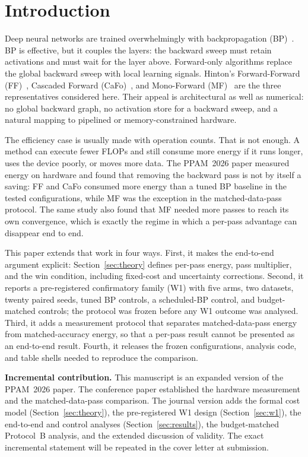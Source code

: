 \documentclass[preprint,12pt]{elsarticle}
\newcommand{\ppam}{the PPAM~2026 paper}
\begin{document}
\section{Introduction}
\label{sec:intro}

Deep neural networks are trained overwhelmingly with backpropagation
(BP)~\cite{rumelhart1986learning}.  BP is effective, but it couples the layers: the
backward sweep must retain activations and must wait for the layer above.
Forward-only algorithms replace the global backward sweep with local learning
signals.  Hinton's Forward-Forward (FF)~\cite{hinton2022forward}, Cascaded Forward
(CaFo)~\cite{zhao2023cafo}, and Mono-Forward (MF)~\cite{gong2025mono} are the
three representatives considered here.  Their appeal is architectural as well
as numerical: no global backward graph, no activation store for a backward
sweep, and a natural mapping to pipelined or memory-constrained hardware.

The efficiency case is usually made with operation counts.  That is not
enough.  A method can execute fewer FLOPs and still consume more energy if it
runs longer, uses the device poorly, or moves more data.  The PPAM~2026 paper
measured energy on hardware and found that removing the backward pass is not by itself
a saving: FF and CaFo consumed more energy than a tuned BP baseline in the
tested configurations, while MF was the exception in the matched-data-pass
protocol.  The same study also found that MF needed more passes to reach its
own convergence, which is exactly the regime in which a per-pass advantage can
disappear end to end.

This paper extends that work in four ways.  First, it makes the end-to-end
argument explicit: Section~\ref{sec:theory} defines per-pass energy, pass
multiplier, and the win condition, including fixed-cost and uncertainty
corrections.  Second, it reports a pre-registered confirmatory family (W1) with
five arms, two datasets, twenty paired seeds, tuned BP controls, a scheduled-BP
control, and budget-matched controls; the protocol was frozen before any W1
outcome was analysed.  Third, it adds a measurement protocol that separates
matched-data-pass energy from matched-accuracy energy, so that a per-pass
result cannot be presented as an end-to-end result.  Fourth, it releases the
frozen configurations, analysis code, and table shells needed to reproduce the
comparison.

\textbf{Incremental contribution.}  This manuscript is an expanded version of
\ppam.  The conference paper established the hardware measurement and the
matched-data-pass comparison.  The journal version adds the formal cost model
(Section~\ref{sec:theory}), the pre-registered W1 design
(Section~\ref{sec:w1}), the end-to-end and control analyses
(Section~\ref{sec:results}), the budget-matched Protocol~B analysis, and the
extended discussion of validity.  The exact incremental statement will be
repeated in the cover letter at submission.
\end{document}
